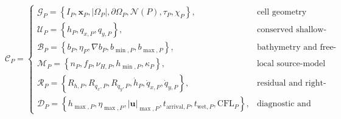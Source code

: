 \documentclass[11pt]{article}
\begin{document}
\begin{equation}
  \label{eq:cell_data_container}
  \mathcal{C}_P
  =
  \begin{cases}
      \mathcal{G}_P
      =
      \left\{
          I_P,
          \mathbf{x}_P,
          |\Omega_P|,
          \partial\Omega_P,
          \mathcal{N}(P),
          \tau_P,
          \chi_P
      \right\},
      & \text{cell geometry}
      \\[0.75em]
      \mathcal{U}_P
      =
      \left\{
          h_P,
          q_{x,P},
          q_{y,P}
      \right\},
      & \text{conserved shallow-water state}
      \\[0.75em]
      \mathcal{B}_P
      =
      \left\{
          b_P,
          \eta_P,
          \nabla b_P,
          b_{\min,P},
          b_{\max,P}
      \right\},
      & \text{bathymetry and free-surface data}
      \\[0.75em]
      \mathcal{M}_P
      =
      \left\{
          n_P,
          f_P,
          \nu_{H,P},
          h_{\min,P},
          \kappa_P
      \right\},
      & \text{local source-model parameters}
      \\[0.75em]
      \mathcal{R}_P
      =
      \left\{
          R_{h,P},
          R_{q_x,P},
          R_{q_y,P},
          \dot{h}_P,
          \dot{q}_{x,P},
          \dot{q}_{y,P}
      \right\},
      & \text{residual and right-hand-side data}
      \\[0.75em]
      \mathcal{D}_P
      =
      \left\{
          h_{\max,P},
          \eta_{\max,P},
          |\mathbf{u}|_{\max,P},
          t_{\mathrm{arrival},P},
          t_{\mathrm{wet},P},
          \mathrm{CFL}_P
      \right\},
      & \text{diagnostic and visualisation data}
  \end{cases}
\end{equation}
\end{document}
